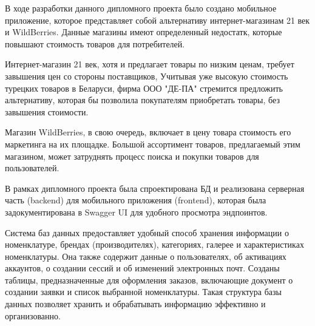 В ходе разработки данного дипломного проекта было создано мобильное приложение,
которое представляет собой альтернативу интернет-магазинам 21 век и WildBerries.
Данные магазины имеют определенный недостатк, которые повышают стоимость товаров для потребителей.

Интернет-магазин 21 век, хотя и предлагает товары по низким ценам,
требует завышения цен со стороны поставщиков,
Учитывая уже высокую стоимость турецких товаров в Беларуси,
фирма ООО "ДЕ-ПА" стремится предложить альтернативу, которая бы позволила покупателям приобретать товары,
без завышения стоимости.

Магазин WildBerries, в свою очередь, включает в цену товара стоимость его маркетинга на их площадке.
Большой ассортимент товаров, предлагаемый этим магазином, может затруднять процесс поиска и покупки товаров для пользователей.


В рамках дипломного проекта была спроектирована БД и реализована серверная часть (backend)
для мобильного приложения (frontend),
которая была задокументирована в Swagger UI для удобного просмотра эндпоинтов.

Система баз данных предоставляет удобный способ хранения информации о номенклатуре, брендах (производителях),
категориях, галерее и характеристиках номенклатуры.
Она также содержит данные о пользователях, об активациях аккаунтов, о создании сессий и об изменений электронных почт.
Созданы таблицы, предназначенные для оформления заказов, включающие документ о создании заявки и список выбранной номенклатуры.
Такая структура базы данных позволяет хранить и обрабатывать информацию эффективно и организованно.



